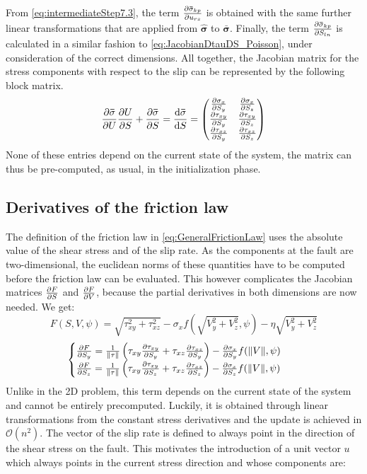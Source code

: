 From \autoref{eq:intermediateStep7.3}, the term $\pdv{\mathbf{\bar{\sigma}}_{kp}}{u_{rs}}$ is obtained with the same further linear transformations that are applied from $\mathbf{\hat{\sigma}}$ to $\mathbf{\bar{\sigma}}$. Finally, the term $\pdv{\mathbf{\bar{\sigma}}_{kp}}{S_{ln}}$ is calculated in a similar fashion to \autoref{eq:JacobianDtauDS_Poisson}, under consideration of the correct dimensions. All together, the Jacobian matrix for the stress components with respect to the slip can be represented by the following block matrix.
\begin{equation}
	\label{eq:stressComponentsJacobian3D}
	\pdv{\mathbf{\bar{\sigma}}}{U}\pdv{U}{S}+ \pdv{\mathbf{\bar{\sigma}}}{S} = \dv{\mathbf{\bar{\sigma}}}{S} = \begin{pmatrix}
		\pdv{\sigma_x}{S_y} & \pdv{\sigma_x}{S_z}\\ 
		\pdv{\tau_{xy}}{S_y}  & \pdv{\tau_{xy}}{S_z} \\ 
		\pdv{\tau_{xz}}{S_y}  & \pdv{\tau_{xz}}{S_z}		
	\end{pmatrix}
\end{equation}
None of these entries depend on the current state of the system, the matrix can thus be pre-computed, as usual, in the initialization phase.

\subsection{Derivatives of the friction law}
The definition of the friction law in \autoref{eq:GeneralFrictionLaw} uses the absolute value of the shear stress and of the slip rate. As the components at the fault are two-dimensional, the euclidean norms of these quantities have to be computed before the friction law can be evaluated. This however complicates the Jacobian matrices $\pdv{F}{S}$ and $\pdv{F}{V}$, because the partial derivatives in both dimensions are now needed. We get:
\begin{equation}
	F(S,V,\psi) = \sqrt{\tau_{xy}^2 + \tau_{xz}^2} - \sigma_xf\left(\sqrt{V_y^2 + V_z^2},\psi\right) - \eta\sqrt{V_y^2 + V_z^2} 
\end{equation}
\begin{align}
	\label{eq:Jacobian_dF_dS_Elasticity3D}
	&\begin{cases}
		\pdv{F}{S_y} = \frac{1}{\norm{\tau}}\left(\tau_{xy}\pdv{\tau_{xy}}{S_y} + \tau_{xz}\pdv{\tau_{xz}}{S_y}\right) - \pdv{\sigma_x}{S_y}f(\norm{V},\psi) \\ 
		\pdv{F}{S_z} = \frac{1}{\norm{\tau}}\left(\tau_{xy}\pdv{\tau_{xy}}{S_z} + \tau_{xz}\pdv{\tau_{xz}}{S_z}\right) - \pdv{\sigma_x}{S_z}f(\norm{V},\psi) 
	\end{cases}
\end{align}
Unlike in the 2D problem, this term depends on the current state of the system and cannot be entirely precomputed. Luckily, it is obtained through linear transformations from the constant stress derivatives and the update is achieved in $\mathcal{O}\left(n^2\right)$. The vector of the slip rate is defined to always point in the direction of the shear stress on the fault. This motivates the introduction of a unit vector $u$ which always points in the current stress direction and whose components are:

